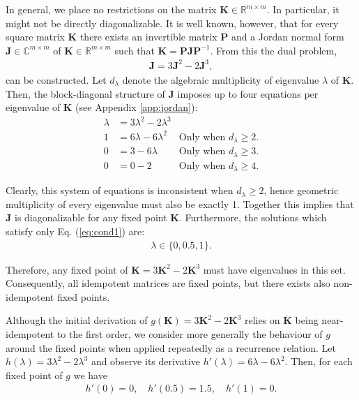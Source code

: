 \documentclass{article}
\theoremstyle{plain}
\theoremstyle{definition}
\theoremstyle{remark}
\newcommand{\vJ}{\mathbf{J}}
\newcommand{\vK}{\mathbf{K}}
\newcommand{\vP}{\mathbf{P}}
\begin{document}
In general, we place no restrictions on the matrix ${\vK \in \mathbb{R}^{m \times m}}$. In particular, it might not be directly diagonalizable. It is well known, however, that for every square matrix $\vK$ there exists an invertible matrix $\vP$ and a Jordan normal form \cite{jordan-form} $\vJ \in \mathbb{C}^{m \times m}$ of ${\vK \in \mathbb{R}^{m \times m}}$ such that ${\vK = \vP \vJ \vP^{-1}}$. From this the dual problem,
\begin{align}
    \vJ = 3 \vJ^2 - 2 \vJ^3,
\end{align}
can be constructed. Let $d_\lambda$ denote the algebraic multiplicity of eigenvalue $\lambda$ of $\vK$. Then, the block-diagonal structure of $\vJ$ imposes up to four equations per eigenvalue of $\vK$ (see Appendix \ref{app:jordan}):
\begin{align}
    \lambda & = 3\lambda^2 - 2\lambda^3 & \label{eq:cond1}                                   \\
    1       & = 6\lambda - 6\lambda^2   & \text{Only when $d_\lambda\geq2$.}\label{eq:cond2} \\
    0       & = 3 - 6\lambda            & \text{Only when $d_\lambda\geq3$.}\label{eq:cond3} \\
    0       & = 0 - 2                   & \text{Only when $d_\lambda\geq4$.}\label{eq:cond4}
\end{align}

Clearly, this system of equations is inconsistent when ${d_{\lambda} \geq 2}$, hence geometric multiplicity of every eigenvalue must also be exactly 1. Together this implies that $\vJ$ is diagonalizable for any fixed point $\vK$. Furthermore, the solutions which satisfy only Eq. (\ref{eq:cond1}) are:
%
\begin{align}
    \lambda \in \{0, 0.5, 1\}.
\end{align}

Therefore, any fixed point of ${\vK = 3 \vK^2 - 2 \vK^3}$ must have eigenvalues in this set. Consequently, all idempotent matrices are fixed points, but there exists also non-idempotent fixed points.

Although the initial derivation of ${g(\vK) = 3 \vK^2 - 2 \vK^3}$ relies on $\vK$ being near-idempotent to the first order, we consider more generally the behaviour of $g$ around the fixed points when applied repeatedly as a recurrence relation. Let ${h(\lambda) = 3\lambda^2 - 2\lambda^3}$ and observe its derivative ${h'(\lambda) = 6\lambda - 6\lambda^2}$. Then, for each fixed point of $g$ we have
\begin{align}
    h'(0) = 0, \quad h'(0.5) = 1.5, \quad h'(1) = 0.
\end{align}
\end{document}
